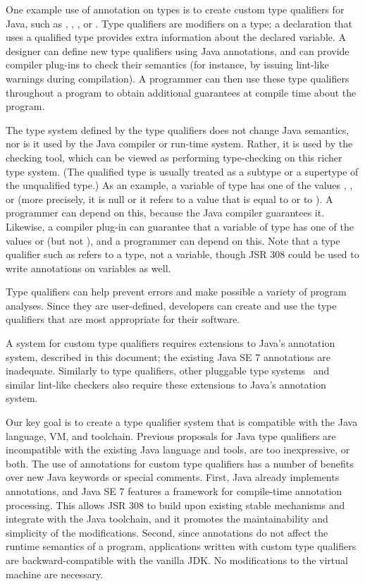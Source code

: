 \documentclass[10pt]{article}
\begin{document}
One example use of annotation on types is to create custom type qualifiers
for Java,
such as , , , or .
Type qualifiers are modifiers on a type; a declaration that uses a
qualified type provides extra
information about the declared variable.
A designer can define new type
qualifiers using Java annotations, and can provide compiler plug-ins to check
their semantics (for instance, by issuing lint-like warnings during
compilation).
A programmer can then use these type qualifiers
throughout a program to obtain additional guarantees at compile time
about the program.

The type system defined by the type qualifiers does not change Java
semantics, nor is it used by the Java compiler or run-time system.  Rather,
it is used by the checking tool, which can be viewed as performing
type-checking on this richer type system.  (The qualified type is usually
treated as a subtype or a supertype of the unqualified type.)
As an example, a variable of type  has one of the values
, , or  (more precisely, it is null or it
refers to a value that is equal to  or to \@).  A
programmer can depend on this, because the Java compiler guarantees it.
Likewise, a compiler plug-in can guarantee that a variable of type
 has one of the values  or 
(but not ), and a programmer can depend on this.  Note that a
type qualifier such as  refers to a type, not a variable,
though JSR 308 could be used to write annotations on variables as well.

Type qualifiers can help prevent errors and make possible a variety of
program analyses.  Since they are user-defined, developers can create
and use the type qualifiers that are most appropriate for their
software.

A system for custom type qualifiers requires
extensions to Java's annotation system, described in this document; the
existing Java SE 7 annotations are inadequate.
Similarly to type qualifiers, other pluggable type
systems~\cite{Bracha2004} and similar lint-like checkers also require these
extensions to Java's annotation system.

Our key goal is to create a type qualifier system that is compatible with
the Java language, VM, and toolchain.
Previous proposals
for Java type qualifiers are incompatible with the existing Java language
and tools, are too inexpressive, or both.
The use of annotations for custom type qualifiers has a number of
benefits over new Java keywords or special comments. First, Java
already implements annotations, and Java SE 7 features a framework
for compile-time annotation processing. This allows JSR 308 to
build upon existing stable mechanisms and integrate with the Java
toolchain, and it promotes the maintainability and simplicity of the
modifications. Second, since annotations do not affect the runtime
semantics of a program, applications written with custom type
qualifiers are backward-compatible with the vanilla JDK\@.
No modifications to the virtual machine are necessary.
\end{document}
